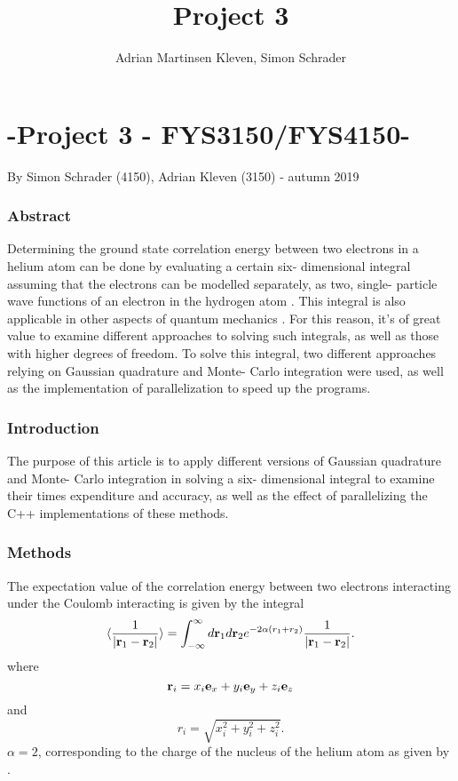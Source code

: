 \documentclass[10pt,a4paper]{article}
\author{Adrian Martinsen Kleven, Simon Schrader}
\title{Project 3}
\begin{document}
\part*{-Project 3 - FYS3150/FYS4150-
}
{\large By Simon Schrader (4150), Adrian Kleven (3150) - autumn 2019
}
\tableofcontents

\listoffigures
\listoftables

 
\clearpage
 
\section{Abstract}
Determining the ground state correlation energy between two electrons in a helium atom can be done by evaluating a certain six- dimensional integral assuming that the electrons can be modelled separately, as two, single- particle wave functions of an electron in the hydrogen atom \cite{Problem_set_3}. This integral is also applicable in other aspects of quantum mechanics \cite{Problem_set_3}. For this reason, it's of great value to examine different approaches to solving such integrals, as well as those with higher degrees of freedom. To solve this integral, two different approaches relying on Gaussian quadrature and Monte- Carlo integration were used, as well as the implementation of parallelization to speed up the programs.
\section{Introduction} 
The purpose of this article is to apply different versions of Gaussian quadrature and Monte- Carlo integration in solving a six- dimensional integral to examine their times expenditure and accuracy, as well as the effect of parallelizing the C++ implementations of these methods.

\section{Methods}
The expectation value of the correlation energy between two electrons interacting under the Coulomb interacting is given by the integral
\begin{equation}\label{eq:correlationenergy}
   \langle \frac{1}{|{\bf r}_1-{\bf r}_2|} \rangle =
   \int_{-\infty}^{\infty} d{\bf r}_1d{\bf r}_2  e^{-2\alpha (r_1+r_2)}\frac{1}{|{\bf r}_1-{\bf r}_2|}.
\end{equation}
where 
$$
   {\bf r}_i =  x_i {\bf e}_x + y_i {\bf e}_y +z_i {\bf e}_z
$$
and
$$
r_i = \sqrt{x_i^2+y_i^2+z_i^2}.
$$
$\alpha = 2$, corresponding to the charge of the nucleus of the helium atom as given by \cite{Problem_set_3}.
\end{document}
